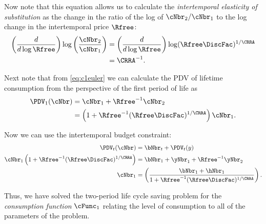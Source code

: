   Now note that this equation allows us to calculate the \textit{intertemporal
    elasticity of substitution} as the change in the ratio of
  the log of $\cNbr_{2}/\cNbr_{1}$ to the log change in the
  intertemporal price $\Rfree$:
  \begin{equation}\begin{gathered}\begin{aligned}
        \left(\frac{d}{d \log \Rfree}\right) \log \left(\frac{\cNbr_{2}}{\cNbr_{1}}\right) & =    \left(\frac{d}{d \log \Rfree}\right) \log (\Rfree \DiscFac)^{1/\CRRA}
        \\ & =  \CRRA^{-1}.
      \end{aligned}\end{gathered}\end{equation}

  Next note that from \eqref{eq:c1euler} we can calculate the PDV of lifetime consumption
  from the perspective of the first period of life as
  \begin{equation}\begin{gathered}\begin{aligned}
        \PDV_{1}(\cNbr) & =  \cNbr_{1} + \Rfree^{-1}\cNbr_{2}  \\
        & =  \left(1+\Rfree^{-1}(\Rfree\DiscFac)^{1/\CRRA}\right)\cNbr_{1}.
      \end{aligned}\end{gathered}\end{equation}

  Now we can use the intertemporal budget constraint:
  \begin{equation}\begin{gathered}\begin{aligned}
        \PDV_{t}(\cNbr) & =  \bNbr_{t}+\PDV_{t}(y)
        \\      \cNbr_{1}\left(1+\Rfree^{-1}(\Rfree\DiscFac)^{1/\CRRA}\right) & =  \bNbr_{1}+\yNbr_{1}+\Rfree^{-1}\yNbr_{2}  \\
        \cNbr_{1} & =  \left(\frac{\bNbr_{1}+\hNbr_{1}}{1+\Rfree^{-1}(\Rfree\DiscFac)^{1/\CRRA}}\right).
      \end{aligned}\end{gathered}\end{equation}

  Thus, we have solved the two-period life cycle saving problem for the
  \textit{consumption function} $\cFunc_{1}$ relating the level of consumption to all of the parameters of the problem.

